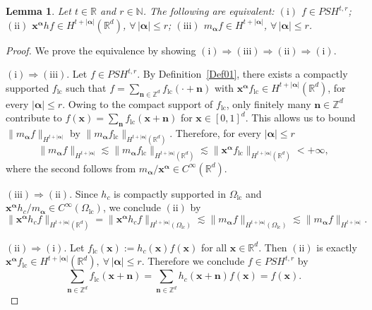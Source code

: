 \documentclass{sn-jnl}%
\numberwithin{equation}{section}
\theoremstyle{thmstyleone}%
\newtheorem{lemma}{Lemma}[section]%
\theoremstyle{thmstyletwo}%
\theoremstyle{thmstylethree}%
\begin{document}
\begin{lemma}\label{Lem6.1}
Let $t\in\mathbb R$ and $r\in\mathbb N$. The following are equivalent: $(\mathrm{i})$ $ f\in PSH^{t,r}$; $(\mathrm{ii})$  $\bm x^{\bm \alpha} h f \in H^{t+|\bm \alpha|}(\mathbb R^d)$, $\forall\, |\bm \alpha|\le r$; $(\mathrm{iii})$ $m_{\bm \alpha} f \in H^{t+|\bm \alpha|}$, $\forall\, |\bm \alpha|\le r$.
\end{lemma}
\begin{proof}
We prove the equivalence by showing
$\mathrm{(i)} \Rightarrow \mathrm{(iii)} \Rightarrow \mathrm{(ii)} \Rightarrow \mathrm{(i)}$.

$\mathrm{(i)} \Rightarrow \mathrm{(iii)}$. Let $f \in PSH^{t,r}$. By Definition~\ref{Def01}, there exists a compactly supported $f_{\mathrm{lc}}$ such that 
    $ f = \sum_{\bm n\in \mathbb{Z}^d}f_{\mathrm{lc}}(\cdot+\bm n) $
    with 
    $\bm x^{\bm \alpha}f_{\mathrm{lc}}\in H^{t+|\bm \alpha|}(\mathbb{R}^d)$, 
    for every $|\bm \alpha|\leq r$. Owing to the compact support of $f_{\mathrm{lc}}$, only finitely many $\bm n \in \mathbb{Z}^d$ contribute to
    $f(\bm x)=\sum_{\bm n} f_{\mathrm{lc}}(\bm x+\bm n)$ for $\bm x \in [0,1]^d$. This allows us to bound
    $\| m_{\bm \alpha}f\|_{H^{t+|\bm \alpha|}}$ by $\| m_{\bm \alpha}f_{\mathrm{lc}}\|_{H^{t+|\bm \alpha|}(\mathbb{R}^d)}$. Therefore, for every $|\bm \alpha|\leq r$
    \[
    \|m_{\bm \alpha}f\|_{H^{t+|\bm \alpha|}} 
    \lesssim \| m_{\bm \alpha}f_{\mathrm{lc}}\|_{H^{t+|\bm \alpha|}(\mathbb{R}^d)} 
    \lesssim \| \bm x^{\bm \alpha}f_{\mathrm{lc}}\|_{H^{t+|\bm \alpha|}(\mathbb{R}^d)}<+\infty,
    \]
    where the second follows from $m_{\bm \alpha}/\bm x^{\bm \alpha}\in C^{\infty}(\mathbb{R}^d)$.

$\mathrm{(iii)} \Rightarrow \mathrm{(ii)}$. 
   Since $h_c$ is compactly supported in $\Omega_{\mathrm{lc}}$ and
    $\bm x^{\bm \alpha}h_c / m_{\bm \alpha} \in C^{\infty}(\Omega_{\mathrm{lc}})$, we conclude $\mathrm{(ii)}$ by
    \[
    \|\bm x^{\bm \alpha} h_cf\|_{H^{t+|\bm \alpha|}(\mathbb{R}^d)}
    =
    \|\bm x^{\bm \alpha} h_cf\|_{H^{t+|\bm \alpha|}(\Omega_{\mathrm{lc}})}
    \lesssim
    \|m_{\bm \alpha} f\|_{H^{t+|\bm \alpha|}(\Omega_{\mathrm{lc}})}
    \lesssim
    \|m_{\bm \alpha} f\|_{H^{t+|\bm \alpha|}}.
    \]
    
$\mathrm{(ii)} \Rightarrow \mathrm{(i)}$.
    Let $f_{\mathrm{lc}}(\bm x):= h_c(\bm x)f(\bm x)$ for all $\bm x\in \mathbb{R}^d$. Then $\mathrm{(ii)}$ is exactly $\bm x^{\bm \alpha}f_{\mathrm{lc}}\in H^{t+|\bm \alpha|}(\mathbb{R}^d),\ \forall\, |\bm \alpha|\leq r$. Therefore we conclude $f\in PSH^{t,r}$ by
    \[
    \sum_{\bm n\in \mathbb{Z}^d} f_{\mathrm{lc}}(\bm x+\bm n)
    =
    \sum_{\bm n\in \mathbb{Z}^d} h_c(\bm x+\bm n) f(\bm x)
    =
    f(\bm x).
    \]
\end{proof}
\end{document}
